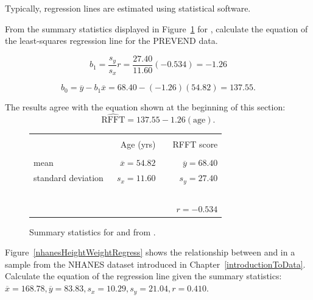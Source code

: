 Typically, regression lines are estimated using statistical software.

\textD{\newpage}

\begin{examplewrap}
\begin{nexample}{From the summary statistics displayed in Figure~\ref{summaryAgeRFFT} for , calculate the equation of the least-squares regression line for the PREVEND data.}

\[b_1 = \frac{s_y}{s_x} r = \frac{27.40}{11.60}(-0.534) = -1.26\]

\[b_0 = \overline{y} - b_1\overline{x} = 68.40 - (-1.26)(54.82) = 137.55. \]

The results agree with the equation shown at the beginning of this section:
\[\widehat{\text{RFFT}} = 137.55 - 1.26(\text{age}).\]
\end{nexample}
\end{examplewrap}

\begin{figure}[ht]
	\centering
	\begin{tabular}{l rr}
		\hline
		\vspace{-4mm} & & \\
		\vspace{0.4mm}	&	\ \ Age (yrs)	& \ \ RFFT score \\
		\hline
		\vspace{-3.9mm} & & \\
		mean	& $\overline{x} = 54.82$		& $\overline{y} = 68.40$ \\
		standard deviation		& $s_x = 11.60$		& $s_y = 27.40$\vspace{0.4mm} \\
		\hline
		\vspace{-4mm}\ &\\
		& \multicolumn{2}{r}{$r=-0.534$} \\
		\hline
	\end{tabular}
	\caption{Summary statistics for  and  from .}
	\label{summaryAgeRFFT}
\end{figure}


\begin{exercisewrap}
\begin{nexercise}
Figure~\ref{nhanesHeightWeightRegress} shows the relationship between  and  in a sample from the NHANES dataset introduced in Chapter~\ref{introductionToData}. Calculate the equation of the regression line given the summary statistics: $\overline{x} = 168.78, \overline{y} = 83.83, s_{x} = 10.29, s_{y} = 21.04, r = 0.410$.\footnotemark{}
\end{nexercise}
\end{exercisewrap}

